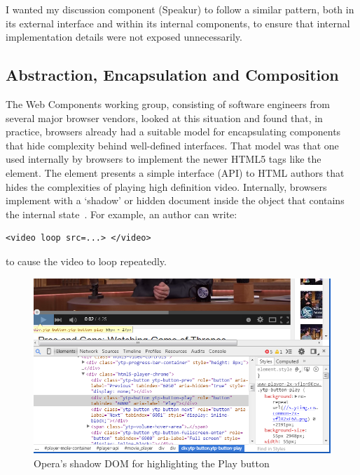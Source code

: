 I wanted my discussion component (Speakur) to follow a similar pattern, 
both in its external interface and within its internal components, 
to ensure that internal implementation details were not exposed unnecessarily.

\subsection{Abstraction, Encapsulation and Composition}

The Web Components working group, consisting of software engineers from several major browser vendors, 
looked at this situation and found that, in practice, browsers already had a suitable model for encapsulating components that hide complexity behind well-defined interfaces.
That model was that one used internally by browsers to implement the newer 
HTML5 tags 
like the \textbf{} element. 
The  element presents a simple interface (API) to HTML authors that hides the complexities of playing high definition video.
Internally, browsers implement  with a `shadow' or hidden document inside the object that contains the internal state~\cite{kitamura2014}. 
For example, an author can write:
\begin{lstlisting}[language=HTML5,numbers=none]
	<video loop src=...> </video>
\end{lstlisting}
to cause the video to loop repeatedly.

\begin{figure}[htb]
\centerline{\includegraphics[width=6in]{images/html5_video_control.png}} 
\caption{Opera's shadow DOM for  highlighting the Play button}
\label{f:html5video}
\end{figure}

